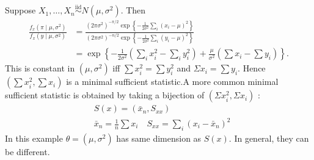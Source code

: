 \documentclass[a4paper]{scrartcl}
\begin{document}
\begin{example*}
      Suppose $X_1 , \ldots ,X_n \overset{\operatorname{iid}}{\sim} N (\mu, \sigma^2)$. Then 
      \begin{align*}
          \frac{f_{x}\left(\pi \mid \mu, \sigma^{2}\right)}{f_{x}\left(y \mid \mu, \sigma^{2}\right)}&=\frac{\left(2 \pi \sigma^{2}\right)^{-\pi / 2} \exp \left\{-\frac{1}{2 \sigma^{2}} \sum_{i}\left(x_{i}-\mu\right)^{2}\right\}}{\left(2 \pi \sigma^{2}\right)^{-n / 2} \exp \left\{-\frac{1}{2 \sigma^{2}} \sum_{i}\left(y_{i}-\mu\right)^{2}\right\}}\\
          &=\exp \left\{-\frac{1}{2 \sigma^{2}}\left(\sum_{i} x_{i}^{2}-\sum_{i} y_{i}^{2}\right)+\frac{\mu}{\sigma^{2}}\left(\sum x_{i}-\sum y_{i}\right)\right\}.
      \end{align*}
      This is constant in $\left(\mu, \sigma^{2}\right)$ iff $\sum x_{i}^{2}=\sum y_{i}^{2}$ and $\Sigma x_{i}=\sum y_{i}$. Hence $\left(\sum x_{i}^{2}, \sum x_{i}\right)$ is a minimal sufficient statistic.A more common minimal sufficient statistic is obtained by taking a bijection of $\left(\Sigma x_{i}^{2}, \Sigma x_{i}\right)$ :
     $$
     \begin{aligned}
     &S(x)=\left(\bar{x}_{n}, S_{x x}\right) \\
     &\bar{x}_{n}=\frac{1}{n} \sum x_{i} \quad S_{x x}=\sum_{i}\left(x_{i}-\bar{x}_{n}\right)^{2}
     \end{aligned}
     $$
In this example $\theta=\left(\mu, \sigma^{2}\right)$ has same dimension as $S(x)$. In general, they can be different.
\end{example*}
\end{document}
